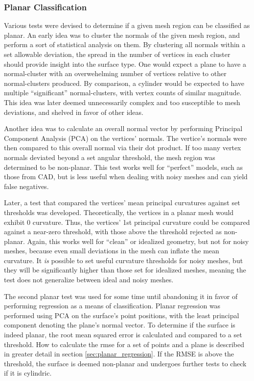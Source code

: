 \subsubsection{Planar Classification}
Various tests were devised to determine if a given mesh region can be classified as planar.
An early idea was to cluster the normals of the given mesh region, and perform a sort of statistical analysis on them.
By clustering all normals within a set allowable deviation, the spread in the number of vertices in each cluster should provide insight into the surface type.
One would expect a plane to have a normal-cluster with an overwehelming number of vertices relative to other normal-clusters produced.
By comparison, a cylinder would be expected to have multiple ``significant'' normal-clusters, with vertex counts of similar magnitude.
This idea was later deemed unnecessarily complex and too susceptible to mesh deviations, and shelved in favor of other ideas.

Another idea was to calculate an overall normal vector by performing Principal Component Analysis (PCA) on the vertices' normals.
The vertice's normals were then compared to this overall normal via their dot product.
If too many vertex normals deviated beyond a set angular threshold, the mesh region was determined to be non-planar.
This test works well for ``perfect'' models, such as those from CAD, but is less useful when dealing with noisy meshes and can yield false negatives.

Later, a test that compared the vertices' mean principal curvatures against set thresholds was developed.
Theoretically, the vertices in a planar mesh would exhibit 0 curvature.
Thus, the vertices' 1st principal curvature could be compared against a near-zero threshold, with those above the threshold rejected as non-planar.
Again, this works well for ``clean'' or idealized geometry, but not for noisy meshes, because even small deviations in the mesh can inflate the mean curvature.
It \textit{is} possible to set useful curvature thresholds for noisy meshes, but they will be significantly higher than those set for idealized meshes, meaning the test does not generalize between ideal and noisy meshes.

The second planar test was used for some time until abandoning it in favor of performing regression as a means of classification.
Planar regression was performed using PCA on the surface's point positions, with the least principal component denoting the plane's normal vector.
To determine if the surface is indeed planar, the root mean squared error is calculated and compared to a set threshold.
How to calculate the rmse for a set of points and a plane is described in greater detail in section \ref{sec:planar_regression}.
If the RMSE is above the threshold, the surface is deemed non-planar and undergoes further tests to check if it is cylindric.

